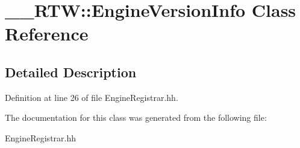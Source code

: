 \section{\_\-\_\-RTW::EngineVersionInfo Class Reference}
\label{class____RTW_1_1EngineVersionInfo}


\subsection{Detailed Description}


Definition at line 26 of file EngineRegistrar.hh.

The documentation for this class was generated from the following file:\begin{DoxyCompactItemize}
\item 
EngineRegistrar.hh\end{DoxyCompactItemize}
